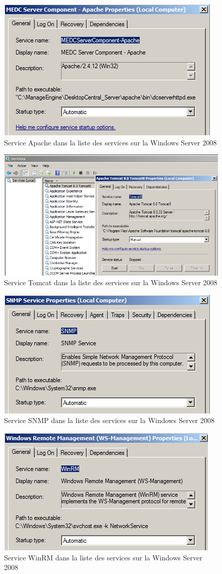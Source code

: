 \documentclass[a4paper]{article}
\begin{document}
\begin{figure}[H]
    \centering
    \includegraphics[width=0.50\linewidth]{images/zabbix-27.png}
    \caption{Service Apache dans la liste des services sur la Windows Server 2008}
    \label{fig:zabbix27}
\end{figure}
\begin{figure}[H]
    \centering
    \includegraphics[width=0.95\linewidth]{images/zabbix-36.png}
    \caption{Service Tomcat dans la liste des services sur la Windows Server 2008}
    \label{fig:zabbix36}
\end{figure}
\begin{figure}[H]
    \centering
    \includegraphics[width=0.50\linewidth]{images/zabbix-41.png}
    \caption{Service SNMP dans la liste des services sur la Windows Server 2008}
    \label{fig:zabbix41}
\end{figure}
\begin{figure}[H]
    \centering
    \includegraphics[width=0.50\linewidth]{images/zabbix-42.png}
    \caption{Service WinRM dans la liste des services sur la Windows Server 2008}
    \label{fig:zabbix42}
\end{figure}
\end{document}
